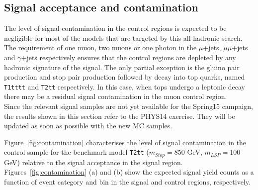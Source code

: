 

\subsection{Signal acceptance and contamination}

The level of signal contamination in the control regions is expected to be negligible 
for most of the models that are targeted by this all-hadronic search. 
The requirement of one muon, two muons or one photon in the $\mu$+jets, $\mu\mu$+jets and $\gamma$+jets respectively 
ensures that the control regions are depleted by any hadronic signature of the signal. 
The only partial exception is the gluino pair production and stop pair production followed by decay into top quarks, named \texttt{T1tttt} and \texttt{T2tt} respectively. 
In this case, when tops undergo a leptonic decay there may be a residual signal contamination in the muon control region. \\
Since the relevant signal samples are not yet available for the Spring15 campaign, the results shown in this section refer to the PHYS14 exercise. 
They will be updated as soon as possible with the new MC samples. 

Figure~\ref{fig:contamination} characterises the level of signal
contamination in the \mj control sample for the benchmark model
\texttt{T2tt} ($m_{Stop}=850$ GeV, $m_{LSP}=100$ GeV) relative to the signal acceptance in the
signal region. Figures~\ref{fig:contamination} (a) and (b) show the
expected signal yield counts as a function of event category and
\scalht bin in the signal and \mj control regions, respectively.

